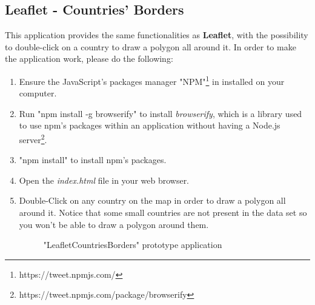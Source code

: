 \documentclass[a4paper,11pt]{report}
\begin{document}
\subsection{Leaflet - Countries' Borders}
\label{leafletCountriesBorders}
This application provides the same functionalities as \textbf{Leaflet}, with the possibility to double-click on a country to draw a polygon all around it. In order to make the application work, please do the following:
\begin{enumerate}
	\item Ensure the JavaScript's packages manager "NPM"\footnote{https://tweet.npmjs.com/} in installed on your computer.
	\item Run "npm install -g browserify" to install \emph{browserify}, which is a library used to use npm's packages within an application without having a Node.js server\footnote{https://tweet.npmjs.com/package/browserify}.
	\item "npm install" to install npm's packages.
	\item Open the \emph{index.html} file in your web browser.
	\newpage
	\item Double-Click on any country on the map in order to draw a polygon all around it. Notice that some small countries are not present in the data set so you won't be able to draw a polygon around them.
	\begin{figure}[H]
	\vspace{-5pt}
	\begin{center}
	\vspace{-5pt}
	\caption{"LeafletCountriesBorders" prototype application}
	\end{center}
	\end{figure}
	\vspace{-20pt}
\end{enumerate}
\end{document}
